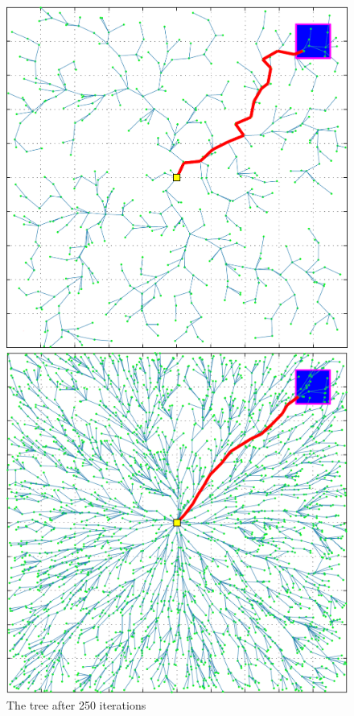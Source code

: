 \documentclass[conference]{IEEEtran}
\begin{document}
\begin{figure}[h]
\centering
\begin{minipage}[t]{0.3\linewidth}
\centering
\includegraphics[width=1\textwidth]{images/RRT/ARSLAN/01.png}
\caption{The tree after 250 iterations}
\end{minipage}
\hfill
\begin{minipage}[t]{0.3\linewidth}
\centering
\includegraphics[width=1\textwidth]{images/RRT/ARSLAN/02.png}

\end{minipage}
\end{figure}
\end{document}
